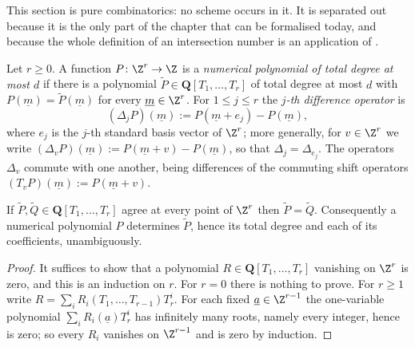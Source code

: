 This section is pure combinatorics: no scheme occurs in it.  It is separated
out because it is the only part of the chapter that can be formalised today,
and because the whole definition of an intersection number is an application of
.

\begin{definition}
\label{def:deg-numerical}
Let $r\geq0$.  A function $P\colon\Z^r\to\Z$ is a \emph{numerical polynomial of
total degree at most $d$} if there is a polynomial
$\widetilde P\in\mathbf Q[T_1,\dots,T_r]$ of total degree at most $d$ with
$P(\underline m)=\widetilde P(\underline m)$ for every $\underline m\in\Z^r$.
For $1\leq j\leq r$ the \emph{$j$-th difference operator} is
\[
  (\Delta_jP)(\underline m):=P(\underline m+e_j)-P(\underline m),
\]
where $e_j$ is the $j$-th standard basis vector of $\Z^r$; more generally, for
$v\in\Z^r$ we write $(\Delta_vP)(\underline m):=P(\underline m+v)-P(\underline
m)$, so that $\Delta_j=\Delta_{e_j}$.  The operators $\Delta_v$ commute with
one another, being differences of the commuting shift operators
$(T_vP)(\underline m):=P(\underline m+v)$.
\end{definition}

\begin{lemma}
\label{lem:deg-numerical-unique}
If $\widetilde P,\widetilde Q\in\mathbf Q[T_1,\dots,T_r]$ agree at every point
of $\Z^r$ then $\widetilde P=\widetilde Q$.  Consequently a numerical
polynomial $P$ determines $\widetilde P$, hence its total degree and each of
its coefficients, unambiguously.
\end{lemma}
\begin{proof}
It suffices to show that a polynomial $R\in\mathbf Q[T_1,\dots,T_r]$ vanishing
on $\Z^r$ is zero, and this is an induction on $r$.  For $r=0$ there is
nothing to prove.  For $r\geq1$ write $R=\sum_{i}R_i(T_1,\dots,T_{r-1})T_r^i$.
For each fixed $\underline a\in\Z^{r-1}$ the one-variable polynomial
$\sum_iR_i(\underline a)T_r^i$ has infinitely many roots, namely every integer,
hence is zero; so every $R_i$ vanishes on $\Z^{r-1}$ and is zero by induction.
\end{proof}

